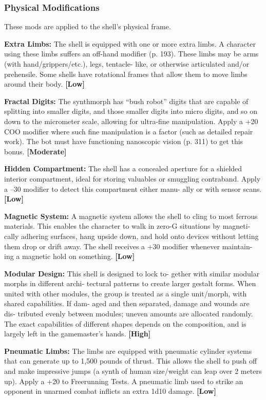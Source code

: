 \subsubsection{Physical Modifications}

These mods are applied to the shell's physical frame.

\textbf{Extra Limbs:} The shell is equipped with one or 
more extra limbs. A character using these limbs 
suffers an off-hand modifier (p. 193). These limbs 
may be arms (with hand/grippers/etc.), legs, tentacle-
like, or otherwise articulated and/or prehensile. Some 
shells have rotational frames that allow them to move 
limbs around their body. \textbf{[Low]}

\textbf{Fractal Digits:} The synthmorph has ``bush robot'' 
digits that are capable of splitting into smaller digits, 
and those smaller digits into micro digits, and so on 
down to the micrometer scale, allowing for ultra-fine 
manipulation. Apply a +20 COO modifier where such 
fine manipulation is a factor (such as detailed repair 
work). The bot must have functioning nanoscopic 
vision (p. 311) to get this bonus. \textbf{[Moderate]}

\textbf{Hidden Compartment:} The shell has a concealed 
aperture for a shielded interior compartment, ideal for 
storing valuables or smuggling contraband. Apply a 
–30 modifier to detect this compartment either manu-
ally or with sensor scans. \textbf{[Low]}

\textbf{Magnetic System:} A magnetic system allows the 
shell to cling to most ferrous materials. This enables 
the character to walk in zero-G situations by magneti-
cally adhering surfaces, hang upside down, and hold 
onto devices without letting them drop or drift away. 
The shell receives a +30 modifier whenever maintain-
ing a magnetic hold on something. \textbf{[Low]}

\textbf{Modular Design:} This shell is designed to lock to-
gether with similar modular morphs in different archi-
tectural patterns to create larger gestalt forms. When 
united with other modules, the group is treated as a 
single unit/morph, with shared capabilities. If dam-
aged and then separated, damage and wounds are dis-
tributed evenly between modules; uneven amounts are 
allocated randomly. The exact capabilities of different 
shapes depends on the composition, and is largely left 
in the gamemaster's hands. \textbf{[High]}

\textbf{Pneumatic Limbs:} The limbs are equipped with 
pneumatic cylinder systems that can generate up to 
1,500 pounds of thrust. This allows the shell to push 
off and make impressive jumps (a synth of human 
size/weight can leap over 2 meters up). Apply a +20 to 
Freerunning Tests. A pneumatic limb used to strike an 
opponent in unarmed combat inflicts an extra 1d10 
damage. \textbf{[Low]}

